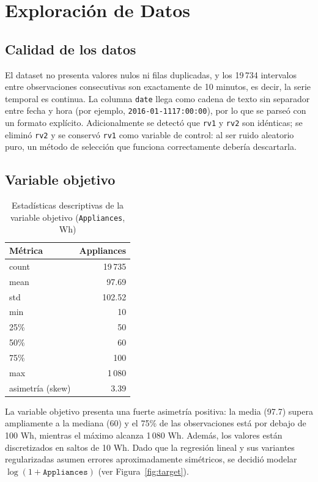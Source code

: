 \documentclass[11pt,a4paper]{article}
\begin{document}
\section{Exploración de Datos}

\subsection{Calidad de los datos}

El dataset no presenta valores nulos ni filas duplicadas, y los 19\,734 intervalos entre
observaciones consecutivas son exactamente de 10 minutos, es decir, la serie temporal es
continua. La columna \texttt{date} llega como cadena de texto sin separador entre fecha y hora
(por ejemplo, \texttt{2016-01-1117:00:00}), por lo que se parseó con un formato explícito.
Adicionalmente se detectó que \texttt{rv1} y \texttt{rv2} son idénticas; se eliminó
\texttt{rv2} y se conservó \texttt{rv1} como variable de control: al ser ruido aleatorio puro,
un método de selección que funciona correctamente debería descartarla.

\subsection{Variable objetivo}

\begin{table}[H]
  \centering
  \caption{Estadísticas descriptivas de la variable objetivo (\texttt{Appliances}, Wh)}
  \begin{tabular}{lr}
    \toprule
    Métrica & Appliances \\
    \midrule
    count & 19\,735 \\
    mean & 97.69 \\
    std & 102.52 \\
    min & 10 \\
    25\% & 50 \\
    50\% & 60 \\
    75\% & 100 \\
    max & 1\,080 \\
    asimetría (skew) & 3.39 \\
    \bottomrule
  \end{tabular}
\end{table}

La variable objetivo presenta una fuerte asimetría positiva: la media (97.7) supera ampliamente
a la mediana (60) y el 75\% de las observaciones está por debajo de 100 Wh, mientras el máximo
alcanza 1\,080 Wh. Además, los valores están discretizados en saltos de 10 Wh. Dado que la
regresión lineal y sus variantes regularizadas asumen errores aproximadamente simétricos, se
decidió modelar $\log(1 + \texttt{Appliances})$ (ver Figura~\ref{fig:target}).
\end{document}
